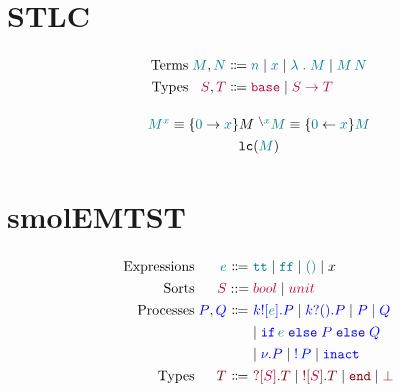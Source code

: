 \documentclass{article}
\begin{document}
\section{STLC}

\begin{displaymath}
  \arraycolsep=1.4pt\def\arraystretch{1.3}
  \begin{array}{rrcl}
    \text{Terms} & \dexp M, \dexp N & \bnfas & \bvar n \bnfalt \fvar x \bnfalt \lam M \bnfalt \app M N\\
    \text{Types} & \dte S, \dte T & \bnfas & \base \bnfalt \arr S T\\
  \end{array}
\end{displaymath}


\begin{displaymath}
  \arraycolsep=1.4pt\def\arraystretch{1.3}
  \begin{array}{cc}
    \openop {\dexp M} {\vex x} \equiv \{\vex 0 \rightarrow \vex x\} M & \closeop {\dexp M} {\vex x} \equiv \{\vex 0 \leftarrow \vex x\} \dexp M \\
    \multicolumn{2}{c}{\lclosed {\dexp M}}\\
  \end{array}
\end{displaymath}



\section{smolEMTST}

\begin{displaymath}
  \arraycolsep=1.4pt\def\arraystretch{1.3}
  \begin{array}{rrcl}
    \text{Expressions} & \dexp{e} & \bnfas & \ett \bnfalt \eff \bnfalt \eone \bnfalt x\\
    \text{Sorts} & \dte{S} & \mathrel{::=} & \tbool \bnfalt \tunit \\

    \text{Processes} & \dproc{P}, \dproc{Q} & \bnfas & \psend k e P \bnfalt \precv k P \bnfalt \ppar P Q\\
    & & & \bnfalt \pif e P Q \\
    & & & \bnfalt \pnu P \bnfalt \pbang P \bnfalt \pinact\\
    \text{Types} & \dst{T} & \bnfas & \tin S T \bnfalt \tout S T \bnfalt \tend \bnfalt \tbot\\
  \end{array}
\end{displaymath}
\end{document}
